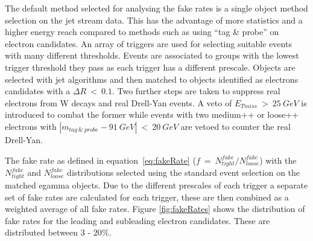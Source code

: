 The default method selected for analysing the fake rates is a single object method selection on the jet stream data. This has the advantage of more statistics and a higher energy reach compared to methods such as using ``tag \& probe'' on electron candidates.
An array of triggers are used for selecting suitable events with many different thresholds. 
Events are associated to groups with the lowest trigger threshold they pass as each trigger has a different prescale. Objects are selected with jet algorithms and then matched to objects identified as electrons candidates with a $\Delta R~<~0.1$. Two further steps are taken to suppress real electrons from W decays and real Drell-Yan events. A veto of $E_{Tmiss}~>~25~GeV$ is introduced to combat the former while events with two medium++ or loose++ electrons with $|m_{tag~\&~probe}-91~GeV|~<~20~GeV$ are vetoed to counter the real Drell-Yan.

The fake rate as defined in equation~\ref{eq:fakeRate} ($f~=~N^{fake}_{tight}/N^{fake}_{loose}$) with the $N^{fake}_{tight}$ and $N^{fake}_{loose}$ distributions selected using the standard event selection on the matched egamma objects.
Due to the different prescales of each trigger a separate set of fake rates are calculated for each trigger, these are then combined as a weighted average of all fake rates. Figure \ref{fig:fakeRates} shows the distribution of fake rates for the leading and subleading electron candidates. These are distributed between 3 - $20\%$. %


